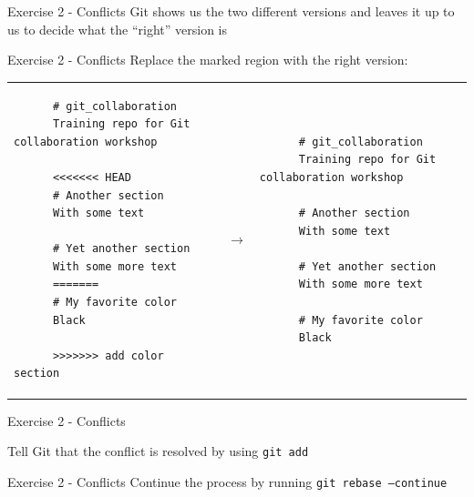 \documentclass{beamer}
\newcommand{\fmtcmd}[1]{\texttt{#1}}
\begin{document}
\begin{frame}{Exercise 2 - Conflicts}
  \center
  \huge Git shows us the two different versions and leaves it up to us
  to decide what the ``right'' version is
\end{frame}

\begin{frame}[fragile]{Exercise 2 - Conflicts}
  \Large Replace the marked region with the right version:
  \vspace{0.5cm}

  \begin{tabular}{ p{} r p{} }
    \begin{minipage}{0.3\textwidth}
    \begin{verbatim}
      # git_collaboration
      Training repo for Git collaboration workshop

      <<<<<<< HEAD
      # Another section
      With some text

      # Yet another section
      With some more text
      =======
      # My favorite color
      Black

      >>>>>>> add color section
    \end{verbatim}
    \end{minipage}
    &
      \hspace{1cm}
      $ \rightarrow $
    &
    \begin{minipage}{0.3\textwidth}
    \begin{verbatim}
      # git_collaboration
      Training repo for Git collaboration workshop

      # Another section
      With some text

      # Yet another section
      With some more text

      # My favorite color
      Black

    \end{verbatim}
    \end{minipage}
    \\
  \end{tabular}
\end{frame}

\begin{frame}{Exercise 2 - Conflicts}
  \center

  \huge Tell Git that the conflict is resolved by using \fmtcmd{git add}
\end{frame}

\begin{frame}{Exercise 2 - Conflicts}
  \center
  \huge Continue the process by running \fmtcmd{git rebase
    --continue}
\end{frame}
\end{document}
